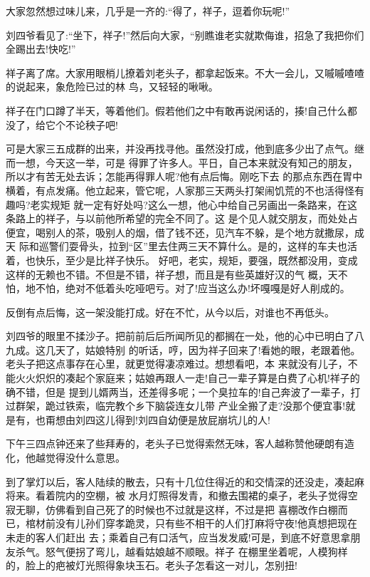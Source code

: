 \documentclass[11pt,a4paper,onecolumn]{article}
\begin{document}
大家忽然想过味儿来，几乎是一齐的:``得了，祥子，逗着你玩呢!''

刘四爷看见了:``坐下，祥子!''然后向大家，``别瞧谁老实就欺侮谁，招急了我把你们全踢出去!快吃!''

祥子离了席。大家用眼梢儿撩着刘老头子，都拿起饭来。不大一会儿，又嘁嘁喳喳的说起来，象危险已过的林
鸟，又轻轻的啾啾。

祥子在门口蹲了半天，等着他们。假若他们之中有敢再说闲话的，揍!自己什么都没了，给它个不论秧子吧!

可是大家三五成群的出来，并没再找寻他。虽然没打成，他到底多少出了点气。继而一想，今天这一举，可是
得罪了许多人。平日，自己本来就没有知己的朋友，所以才有苦无处去诉；怎能再得罪人呢?他有点后悔。刚吃下去
的那点东西在胃中横着，有点发痛。他立起来，管它呢，人家那三天两头打架闹饥荒的不也活得怪有趣吗?老实规矩
就一定有好处吗?这么一想，他心中给自己另画出一条路来，在这条路上的祥子，与以前他所希望的完全不同了。这
是个见人就交朋友，而处处占便宜，喝别人的茶，吸别人的烟，借了钱不还，见汽车不躲，是个地方就撒尿，成天
际和巡警们耍骨头，拉到``区''里去住两三天不算什么。是的，这样的车夫也活着，也快乐，至少是比祥子快乐。
好吧，老实，规矩，要强，既然都没用，变成这样的无赖也不错。不但是不错，祥子想，而且是有些英雄好汉的气
概，天不怕，地不怕，绝对不低着头吃哑吧亏。对了!应当这么办!坏嘎嘎是好人削成的。

反倒有点后悔，这一架没能打成。好在不忙，从今以后，对谁也不再低头。

刘四爷的眼里不揉沙子。把前前后后所闻所见的都搁在一处，他的心中已明白了八九成。这几天了，姑娘特别
的听话，哼，因为祥子回来了!看她的眼，老跟着他。老头子把这点事存在心里，就更觉得凄凉难过。想想看吧，本
来就没有儿子，不能火火炽炽的凑起个家庭来；姑娘再跟人一走!自己一辈子算是白费了心机!祥子的确不错，但是
提到儿婿两当，还差得多呢；一个臭拉车的!自己奔波了一辈子，打过群架，跪过铁索，临完教个乡下脑袋连女儿带
产业全搬了走?没那个便宜事!就是有，也甭想由刘四这儿得到!刘四自幼便是放屁崩坑儿的人!

下午三四点钟还来了些拜寿的，老头子已觉得索然无味，客人越称赞他硬朗有造化，他越觉得没什么意思。

到了掌灯以后，客人陆续的散去，只有十几位住得近的和交情深的还没走，凑起麻将来。看着院内的空棚，被
水月灯照得发青，和撤去围裙的桌子，老头子觉得空寂无聊，仿佛看到自己死了的时候也不过就是这样，不过是把
喜棚改作白棚而已，棺材前没有儿孙们穿孝跪灵，只有些不相干的人们打麻将守夜!他真想把现在未走的客人们赶出
去；乘着自己有口活气，应当发发威!可是，到底不好意思拿朋友杀气。怒气便拐了弯儿，越看姑娘越不顺眼。祥子
在棚里坐着呢，人模狗样的，脸上的疤被灯光照得象块玉石。老头子怎看这一对儿，怎别扭!
\end{document}
